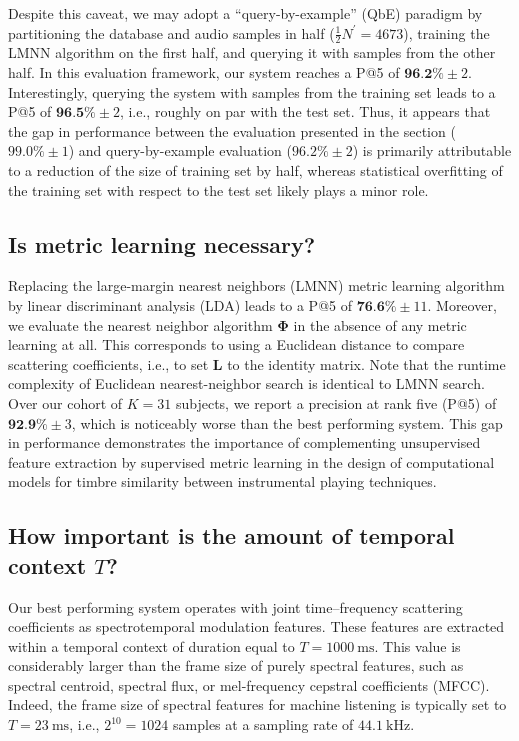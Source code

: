 \documentclass{bmcart}
\newcommand{\lnameref}[1]{%
\bgroup
\let\nmu\MakeLowercase
\nameref{#1}\egroup}
\newcommand{\nmu}{}
\begin{document}
Despite this caveat, we may adopt a ``query-by-example'' (QbE) paradigm by  partitioning the database and audio samples in half ($\frac{1}{2}N^{\prime}=4673$), training the LMNN algorithm on the first half, and querying it with samples from the other half.
In this evaluation framework, our system reaches a P@5 of $\textbf{96.2\%} \pm 2$.
Interestingly, querying the system with samples from the training set leads to a P@5 of $\textbf{96.5\%} \pm 2$, i.e., roughly on par with the test set.
Thus, it appears that the gap in performance between the evaluation presented in the \lnameref{sec:results} section ($99.0\%\pm 1$) and query-by-example evaluation ($96.2\% \pm 2$) is primarily attributable to a reduction of the size of training set by half, whereas statistical overfitting of the training set with respect to the test set likely plays a minor role.


\subsection*{Is metric learning necessary?}
Replacing the large-margin nearest neighbors (LMNN) metric learning algorithm by linear discriminant analysis (LDA) leads to a P@5 of $\textbf{76.6}\% \pm 11$.
Moreover, we evaluate the nearest neighbor algorithm $\mathbf{\Phi}$ in the absence of any metric learning at all.
This corresponds to using a Euclidean distance to compare scattering coefficients, i.e., to set $\mathbf{L}$ to the identity matrix.
Note that the runtime complexity of Euclidean nearest-neighbor search is identical to LMNN search.
Over our cohort of $K=31$ subjects, we report a precision at rank five (P@5) of $\textbf{92.9\%} \pm 3$, which is noticeably worse than the best performing system.
This gap in performance demonstrates the importance of complementing unsupervised feature extraction by supervised metric learning in the design  of computational models for timbre similarity between instrumental playing techniques.

\subsection*{How important is the amount of temporal context $T$?}

Our best performing system operates with joint time--frequency scattering coefficients as spectrotemporal modulation features.
These features are extracted within a temporal context of duration equal to $T=\SI{1000}{\milli\second}$.
This value is considerably larger than the frame size of purely spectral features, such as spectral centroid, spectral flux, or mel-frequency cepstral coefficients (MFCC).
Indeed, the frame size of spectral features for machine listening is typically set to $T=\SI{23}{\milli\second}$, i.e., $2^{10}=1024$ samples at a sampling rate of $\SI{44,1}{\kilo\hertz}$.
\end{document}
